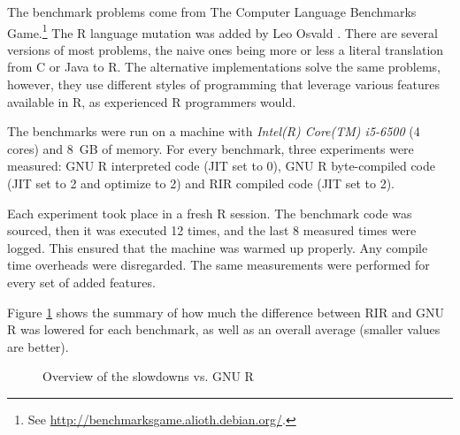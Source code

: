 The benchmark problems come from The Computer Language Benchmarks Game.\footnote{See \url{http://benchmarksgame.alioth.debian.org/}.} The R language mutation was added by Leo Osvald \autocite{shootout}. There are several versions of most problems, the naive ones being more or less a literal translation from C or Java to R. The alternative implementations solve the same problems, however, they use different styles of programming that leverage various features available in R, as experienced R programmers would.

The benchmarks were run on a machine with \emph{Intel(R) Core(TM) i5-6500} (4 cores) and 8~GB of memory. For every benchmark, three experiments were measured: GNU R interpreted code (JIT set to 0), GNU R byte-compiled code (JIT set to 2 and optimize to 2) and RIR compiled code (JIT set to 2).

Each experiment took place in a fresh R session. The benchmark code was sourced, then it was executed 12 times, and the last 8 measured times were logged. This ensured that the machine was warmed up properly. Any compile time overheads were disregarded. The same measurements were performed for every set of added features.

Figure \ref{fig:overall} shows the summary of how much the difference between RIR and GNU R was lowered for each benchmark, as well as an overall average (smaller values are better).

\begin{figure}[htbp]
  \caption{\label{fig:overall}Overview of the slowdowns vs. GNU R}
  \centering
\end{figure}

